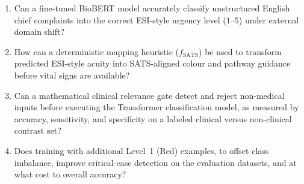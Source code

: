 \begin{enumerate}
\item Can a fine-tuned BioBERT model accurately classify unstructured English chief complaints into the correct ESI-style urgency level (\(1\)--\(5\)) under external domain shift?
\item How can a deterministic mapping heuristic (\(f_{\mathrm{SATS}}\)) be used to transform predicted ESI-style acuity into SATS-aligned colour and pathway guidance before vital signs are available?
\item Can a mathematical clinical relevance gate detect and reject non-medical inputs before executing the Transformer classification model, as measured by accuracy, sensitivity, and specificity on a labeled clinical versus non-clinical contrast set?
\item Does training with additional Level~1 (Red) examples, to offset class imbalance, improve critical-case detection on the evaluation datasets, and at what cost to overall accuracy?
\end{enumerate}

